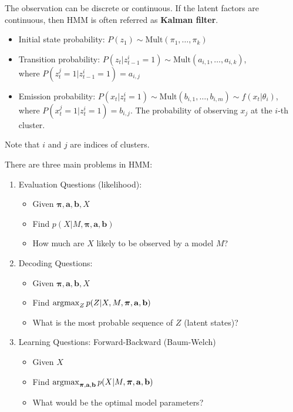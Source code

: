 The observation can be discrete or continuous. If the latent factors are continuous, then HMM is often referred as \textbf{Kalman filter}. 

\begin{itemize}
	\item Initial state probability: $P(z_1)\sim \textrm{Mult}(\pi_1, \dots, \pi_k)$
	\item Transition probability: $P(z_t|z^i_{t-1}=1)\sim \textrm{Mult}(a_{i,1}, \dots, a_{i,k})$, \\ where $P(z_t^j=1|z_{t-1}^i=1) = a_{i,j}$
	\item Emission probability: $P(x_t|z_t^i=1)\sim \textrm{Mult}(b_{i,1}, \dots, b_{i,m})\sim f(x_t|\theta_i)$,\\ where $P(x_t^j=1|z_{t}^i=1) = b_{i,j}$. The probability of observing $x_j$ at the  $i$-th cluster. 
\end{itemize}
Note that $i$ and $j$ are indices of clusters. 

There are three main problems in HMM:
\begin{enumerate}
	\item Evaluation Questions (likelihood): %
	\begin{itemize}
		\item Given $\boldsymbol{\pi}\mathbf{, a, b}, X$
		\item Find $p(X|M, \boldsymbol{\pi}\mathbf{, a, b})$
		\item How much are $X$ likely to be observed by a model $M$?
	\end{itemize}
	
	\item Decoding Questions:
	\begin{itemize}
		\item Given $\boldsymbol{\pi}\mathbf{, a, b}, X$
		\item Find $\operatorname*{\operatorname{argmax}}_Z p(Z|X, M, \boldsymbol{\pi}\mathbf{, a, b})$
		\item What is the most probable sequence of $Z$ (latent states)? 
	\end{itemize}
	
	\item Learning Questions: Forward-Backward (Baum-Welch)
	\begin{itemize}
		\item Given $X$
		\item Find $\operatorname*{\operatorname{argmax}}_{\boldsymbol{\pi}\mathbf{, a, b}} p(X|M, \boldsymbol{\pi}\mathbf{, a, b})$
		\item What would be the optimal model parameters? 
	\end{itemize}
\end{enumerate}


